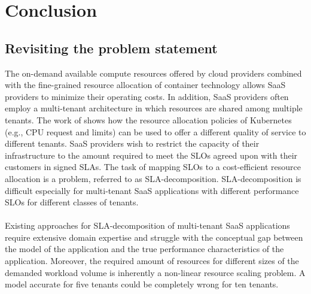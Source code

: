 \chapter{Conclusion}
\label{ch:conclusion}


\section{Revisiting the problem statement}
The on-demand available compute resources offered by cloud providers combined with the fine-grained resource allocation of container technology  allows SaaS providers to minimize their operating costs. In addition, SaaS providers often employ a multi-tenant architecture in which resources are shared among multiple tenants. The work of \cite{TruyenEddy2016Taca} shows how the resource allocation policies of Kubernetes (e.g., CPU request and limits) can be used to offer a different quality of service to different tenants.  SaaS providers  wish to restrict the capacity of their infrastructure to the amount required to meet the SLOs agreed upon with their customers in signed SLAs. The task of  mapping SLOs to a cost-efficient resource allocation is a problem, referred to as SLA-decomposition. SLA-decomposition is difficult especially for multi-tenant SaaS applications with different performance SLOs for different classes of tenants.
\\\\
Existing approaches for SLA-decomposition of multi-tenant SaaS applications require extensive domain expertise and struggle with the conceptual gap between the model of the application and the true performance characteristics of the application. Moreover,   the required amount of resources for different sizes of the demanded workload volume is inherently a non-linear resource scaling problem. A model accurate for five tenants could be completely wrong for ten tenants.
